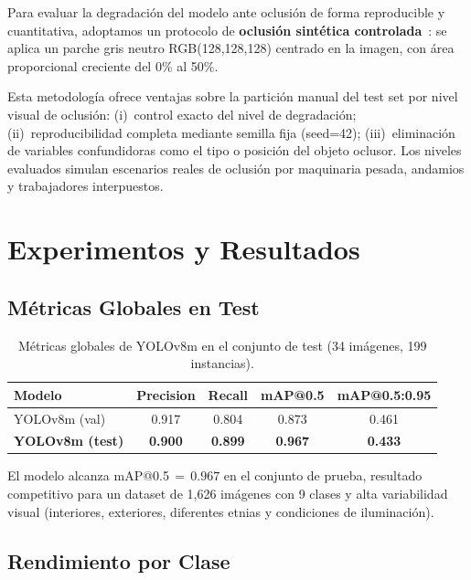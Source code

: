 \documentclass{article}
\begin{document}
Para evaluar la degradación del modelo ante oclusión de forma
reproducible y cuantitativa, adoptamos un protocolo de
\textbf{oclusión sintética controlada}~\cite{dwibedi2017cut}:
se aplica un parche gris neutro RGB(128,128,128) centrado en la imagen,
con área proporcional creciente del 0\% al 50\%.

Esta metodología ofrece ventajas sobre la partición manual del test set
por nivel visual de oclusión: (i)~control exacto del nivel de degradación;
(ii)~reproducibilidad completa mediante semilla fija (seed=42);
(iii)~eliminación de variables confundidoras como el tipo o posición del
objeto oclusor. Los niveles evaluados simulan escenarios reales de
oclusión por maquinaria pesada, andamios y trabajadores interpuestos.

\section{Experimentos y Resultados}
\label{sec:experiments}

\subsection{Métricas Globales en Test}

\begin{table}[h]
  \centering
  \caption{Métricas globales de YOLOv8m en el conjunto de test
           (34 imágenes, 199 instancias).}
  \label{tab:global}
  \small
  \begin{tabular}{lcccc}
    \toprule
    \textbf{Modelo} & \textbf{Precision}
                    & \textbf{Recall}
                    & \textbf{mAP@0.5}
                    & \textbf{mAP@0.5:0.95} \\
    \midrule
    YOLOv8m (val)  & 0.917 & 0.804 & 0.873 & 0.461 \\
    \textbf{YOLOv8m (test)} & \textbf{0.900} & \textbf{0.899}
                             & \textbf{0.967} & \textbf{0.433} \\
    \bottomrule
  \end{tabular}
\end{table}

El modelo alcanza mAP@0.5\,$=\,0.967$ en el conjunto de prueba,
resultado competitivo para un dataset de 1{,}626 imágenes con 9 clases
y alta variabilidad visual (interiores, exteriores, diferentes etnias
y condiciones de iluminación).

\subsection{Rendimiento por Clase}
\end{document}
